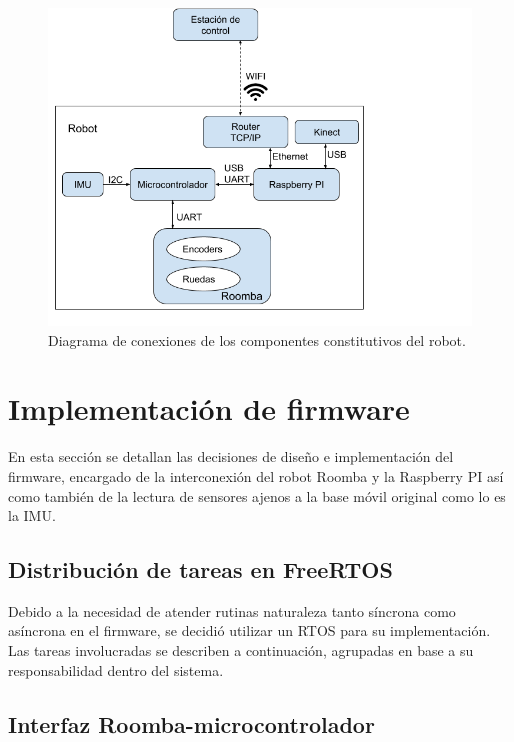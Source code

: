\begin{figure}[ht]
    \centering
    \includegraphics[scale=0.5]{./Figures/lubobot_conexiones.png}
    \caption{Diagrama de conexiones de los componentes constitutivos del robot.}
    \label{fig:lubobotComponentes}
\end{figure}

\newpage

\section{Implementación de firmware}

En esta sección se detallan las decisiones de diseño e implementación del firmware, encargado de la interconexión del robot Roomba y la Raspberry PI así como también de la lectura de sensores ajenos a la base móvil original como lo es la IMU.

\subsection{Distribución de tareas en FreeRTOS}

Debido a la necesidad de atender rutinas naturaleza tanto síncrona como asíncrona en el firmware, se decidió utilizar un RTOS para su implementación. Las tareas involucradas se describen a continuación, agrupadas en base a su responsabilidad dentro del sistema.

\subsection{Interfaz Roomba-microcontrolador}

